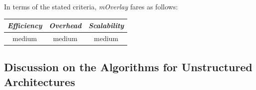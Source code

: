 %
In terms of the stated criteria, \emph{mOverlay} fares as follows:
\begin{center}
{\footnotesize
\begin{tabular}{ccc}
\emph{Efficiency} & \emph{Overhead} & \emph{Scalability} \\
\hline
medium &
medium &
medium
\end{tabular}
}
\end{center}

\subsection{Discussion on the Algorithms for Unstructured Architectures}


